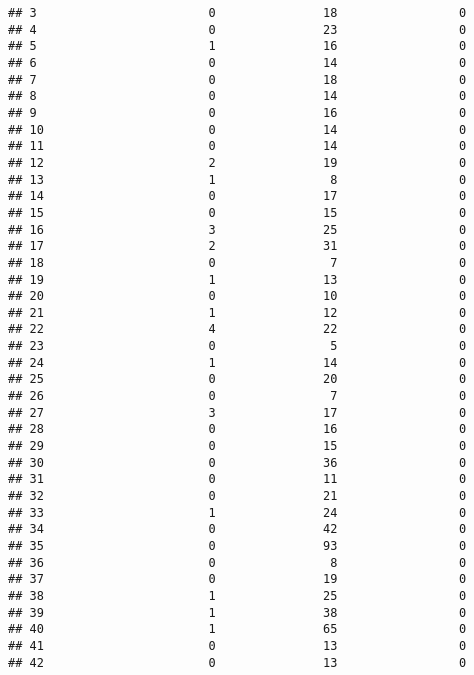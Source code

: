\documentclass[
]{article}
\begin{document}
\begin{verbatim}
## 3                        0               18                 0
## 4                        0               23                 0
## 5                        1               16                 0
## 6                        0               14                 0
## 7                        0               18                 0
## 8                        0               14                 0
## 9                        0               16                 0
## 10                       0               14                 0
## 11                       0               14                 0
## 12                       2               19                 0
## 13                       1                8                 0
## 14                       0               17                 0
## 15                       0               15                 0
## 16                       3               25                 0
## 17                       2               31                 0
## 18                       0                7                 0
## 19                       1               13                 0
## 20                       0               10                 0
## 21                       1               12                 0
## 22                       4               22                 0
## 23                       0                5                 0
## 24                       1               14                 0
## 25                       0               20                 0
## 26                       0                7                 0
## 27                       3               17                 0
## 28                       0               16                 0
## 29                       0               15                 0
## 30                       0               36                 0
## 31                       0               11                 0
## 32                       0               21                 0
## 33                       1               24                 0
## 34                       0               42                 0
## 35                       0               93                 0
## 36                       0                8                 0
## 37                       0               19                 0
## 38                       1               25                 0
## 39                       1               38                 0
## 40                       1               65                 0
## 41                       0               13                 0
## 42                       0               13                 0

\end{verbatim}
\end{document}
